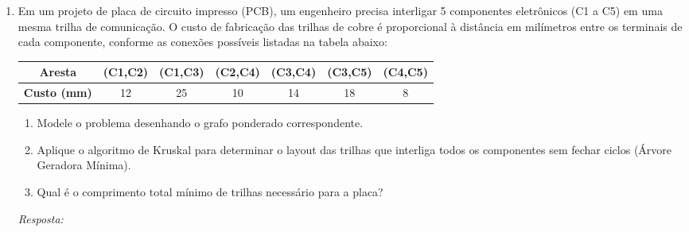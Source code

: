 \documentclass[12pt]{article}
\newcommand{\quadro}[1]{\vspace{0.2cm}\begin{tcolorbox}[colback=white, colframe=black, height=#1, boxrule=0.5pt, arc=0pt] \textit{Resposta:} \end{tcolorbox}}
\begin{document}
\begin{enumerate}[label=\arabic*), leftmargin=1.5cm, itemsep=0.8cm]
\item Em um projeto de placa de circuito impresso (PCB), um engenheiro precisa interligar 5 componentes eletrônicos (C1 a C5) em uma mesma trilha de comunicação. O custo de fabricação das trilhas de cobre é proporcional à distância em milímetros entre os terminais de cada componente, conforme as conexões possíveis listadas na tabela abaixo:
\begin{center}
\end{center}

\begin{center}
    \begin{tabular}{|c|c|c|c|c|c|c|}
        \hline
        \textbf{Aresta} & (C1,C2) & (C1,C3) & (C2,C4) & (C3,C4) & (C3,C5) & (C4,C5) \\ \hline
        \textbf{Custo (mm)} & 12 & 25 & 10 & 14 & 18 & 8 \\ \hline
    \end{tabular}
\end{center}
\begin{enumerate}[label=\alph*)]
    \item Modele o problema desenhando o grafo ponderado correspondente.
    \item Aplique o algoritmo de Kruskal para determinar o layout das trilhas que interliga todos os componentes sem fechar ciclos (Árvore Geradora Mínima).
    \item Qual é o comprimento total mínimo de trilhas necessário para a placa?
\end{enumerate}
\quadro{6cm}


\end{enumerate}
\end{document}
